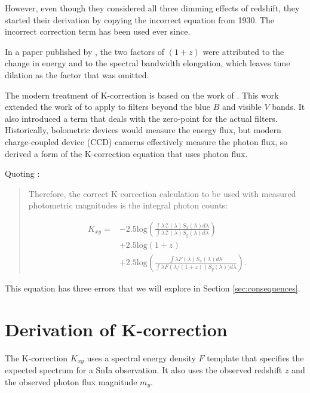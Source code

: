 \documentclass[aps,prl,reprint,amsmath]{revtex4-2}
\begin{document}
\noindent However, even though they considered all three dimming effects of
redshift, they started their derivation by copying the incorrect equation from
1930. The incorrect correction term has been used ever since.

In a paper published by \citet{oke1968}, the two factors of $(1 + z)$ were
attributed to the change in energy and to the spectral bandwidth elongation,
which leaves time dilation as the factor that was omitted.

The modern treatment of K-correction is based on the work of \citet{kim1996}.
This work extended the work of \citet{oke1968} to apply to filters beyond the
blue $B$ and visible $V$ bands. It also introduced a term that deals with the
zero-point for the actual filters. Historically, bolometric devices would
measure the energy flux, but modern charge-coupled device (CCD) cameras
effectively measure the photon flux, so \citet{kim1996} derived a form of the
K-correction equation that uses photon flux.

Quoting \citet{kim1996}:

\begin{quote}
  Therefore, the correct K correction calculation to be used with measured
  photometric magnitudes is the integral photon counts:

  \begin{equation}
  \begin{aligned}
  \label{eq:kim}
    K_{xy} =
      &-2.5\text{log} \left(
        \frac{\int \lambda \mathcal{Z}(\lambda)S_x(\lambda)d\lambda}
             {\int \lambda \mathcal{Z}(\lambda)S_y(\lambda)d\lambda}\right) \\
      &+ 2.5\text{log}(1+z) \\
      &+ 2.5\text{log}\left(
        \frac{\int \lambda F(\lambda)S_x(\lambda)d\lambda}
             {\int \lambda F(\lambda/(1+z))S_y(\lambda))d\lambda}\right).
  \end{aligned}
  \end{equation}
\end{quote}

This equation has three errors that we will explore in Section
\ref{sec:consequences}.

\section{Derivation of K-correction}
\label{sec:derivation}

The K-correction $K_{xy}$ uses a spectral energy density $F$ template that
specifies the expected spectrum for a SnIa observation. It also uses the
observed redshift $z$ and the observed photon flux magnitude $m_y$.
\end{document}
